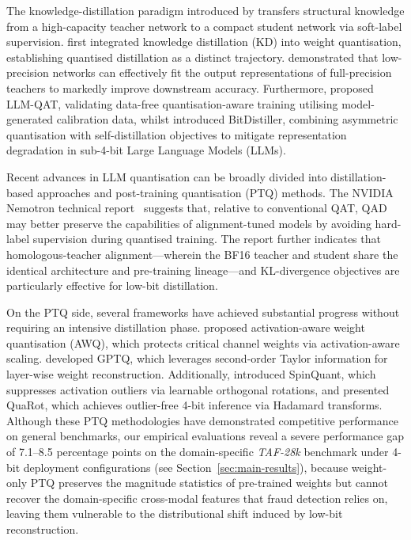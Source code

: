 \documentclass[a4paper,fleqn]{cas-sc}
\begin{document}
The knowledge-distillation paradigm introduced by \citet{4} transfers structural knowledge from a high-capacity teacher network to a compact student network via soft-label supervision. \citet{5} first integrated knowledge distillation (KD) into weight quantisation, establishing quantised distillation as a distinct trajectory. \citet{6} demonstrated that low-precision networks can effectively fit the output representations of full-precision teachers to markedly improve downstream accuracy. Furthermore, \citet{7} proposed LLM-QAT, validating data-free quantisation-aware training utilising model-generated calibration data, whilst \citet{8} introduced BitDistiller, combining asymmetric quantisation with self-distillation objectives to mitigate representation degradation in sub-4-bit Large Language Models (LLMs).

Recent advances in LLM quantisation can be broadly divided into distillation-based approaches and post-training quantisation (PTQ) methods. The NVIDIA Nemotron technical report~\citep{3} suggests that, relative to conventional QAT, QAD may better preserve the capabilities of alignment-tuned models by avoiding hard-label supervision during quantised training. The report further indicates that homologous-teacher alignment---wherein the BF16 teacher and student share the identical architecture and pre-training lineage---and KL-divergence objectives are particularly effective for low-bit distillation.

On the PTQ side, several frameworks have achieved substantial progress without requiring an intensive distillation phase. \citet{9} proposed activation-aware weight quantisation (AWQ), which protects critical channel weights via activation-aware scaling. \citet{10} developed GPTQ, which leverages second-order Taylor information for layer-wise weight reconstruction. Additionally, \citet{11} introduced SpinQuant, which suppresses activation outliers via learnable orthogonal rotations, and \citet{12} presented QuaRot, which achieves outlier-free 4-bit inference via Hadamard transforms. Although these PTQ methodologies have demonstrated competitive performance on general benchmarks, our empirical evaluations reveal a severe performance gap of 7.1--8.5 percentage points on the domain-specific \textit{TAF-28k} benchmark under 4-bit deployment configurations (see Section~\ref{sec:main-results}), because weight-only PTQ preserves the magnitude statistics of pre-trained weights but cannot recover the domain-specific cross-modal features that fraud detection relies on, leaving them vulnerable to the distributional shift induced by low-bit reconstruction.
\end{document}
